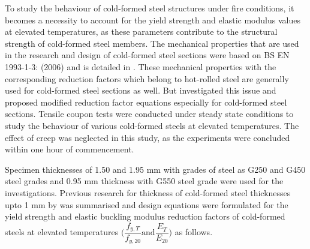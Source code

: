 To study the behaviour of cold-formed steel structures under fire conditions, it becomes a necessity to account for the yield strength and elastic modulus values at elevated temperatures, as these parameters contribute to the structural strength of cold-formed steel members. The mechanical properties that are used in the research and design of cold-formed steel sections were based on BS EN 1993-1-3: (2006) and is detailed in . These mechanical properties with the corresponding reduction factors which belong to hot-rolled steel are generally used for cold-formed steel sections as well. But \citet{Kankanamge2011} investigated this issue and proposed modified reduction factor equations especially for cold-formed steel sections. Tensile coupon tests were conducted under steady state conditions to study the behaviour of various cold-formed steels at elevated temperatures. The effect of creep was neglected in this study, as the experiments were concluded within one hour of commencement.

Specimen thicknesses of 1.50 and 1.95 mm with grades of steel as G250 and G450 steel grades and 0.95 mm thickness with G550 steel grade were used for the investigations. Previous research for thickness of cold-formed steel thicknesses upto 1 mm by \citet{Ranawaka2009a} was summarised and design equations were formulated for the yield strength and elastic buckling modulus reduction factors of cold-formed steels at elevated temperatures $\Big(\dfrac{f_{y,T}}{f_{y,20}} \text{and} \dfrac{E_T}{E_{20}} \Big)$ as follows.

